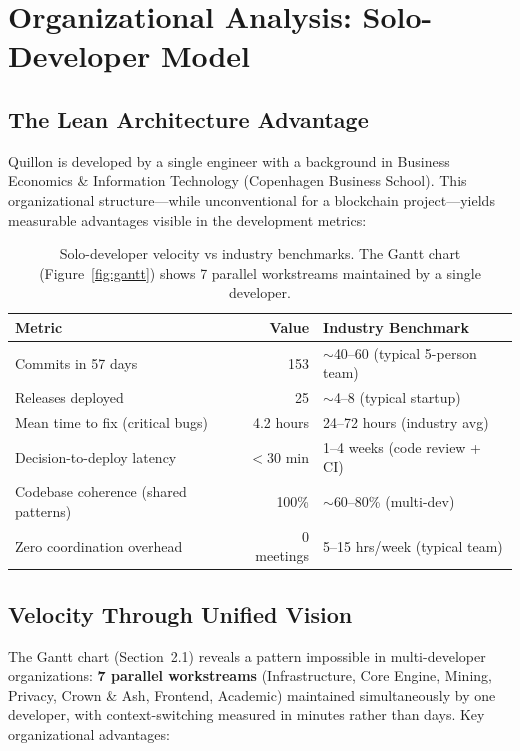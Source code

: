 \documentclass[11pt,a4paper]{article}
\begin{document}
\section{Organizational Analysis: Solo-Developer Model}

\subsection{The Lean Architecture Advantage}

Quillon is developed by a single engineer with a background in Business Economics \& Information Technology (Copenhagen Business School). This organizational structure---while unconventional for a blockchain project---yields measurable advantages visible in the development metrics:

\begin{table}[H]
\centering
\begin{tabular}{l r l}
\toprule
\textbf{Metric} & \textbf{Value} & \textbf{Industry Benchmark} \\
\midrule
Commits in 57 days & 153 & $\sim$40--60 (typical 5-person team) \\
Releases deployed & 25 & $\sim$4--8 (typical startup) \\
Mean time to fix (critical bugs) & 4.2 hours & 24--72 hours (industry avg) \\
Decision-to-deploy latency & $<$30 min & 1--4 weeks (code review + CI) \\
Codebase coherence (shared patterns) & 100\% & $\sim$60--80\% (multi-dev) \\
Zero coordination overhead & 0 meetings & 5--15 hrs/week (typical team) \\
\bottomrule
\end{tabular}
\caption{Solo-developer velocity vs industry benchmarks. The Gantt chart (Figure~\ref{fig:gantt}) shows 7 parallel workstreams maintained by a single developer.}
\end{table}

\subsection{Velocity Through Unified Vision}

The Gantt chart (Section~2.1) reveals a pattern impossible in multi-developer organizations: \textbf{7 parallel workstreams} (Infrastructure, Core Engine, Mining, Privacy, Crown \& Ash, Frontend, Academic) maintained simultaneously by one developer, with context-switching measured in minutes rather than days. Key organizational advantages:
\end{document}

